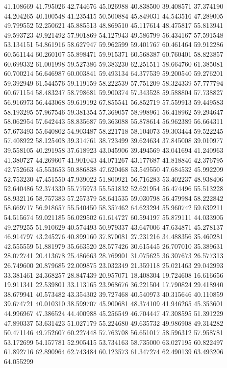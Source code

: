 41.108669
41.795026
42.744676
45.026988
40.838500
39.408571
37.374190
44.204265
40.100548
41.235415
50.500884
45.849031
44.543516
47.289005
49.799552
52.250621
45.885513
48.869510
45.117614
48.475817
55.813941
49.593723
49.921492
57.901869
54.127943
49.586799
56.434167
57.591548
53.134151
54.861916
58.627947
59.962599
59.401767
60.461464
59.912286
60.561144
60.260107
55.898471
59.915371
60.568387
60.760401
58.823857
60.699332
61.001998
59.527386
59.383230
62.251511
58.664760
61.385081
60.700214
56.646987
60.003841
59.493134
64.377539
59.200540
59.276201
59.392949
61.544576
59.119159
58.222539
57.751209
58.324339
57.777794
60.671154
58.483247
58.798681
59.900374
57.343528
59.588804
57.738827
56.916973
56.443068
59.619192
67.855541
56.852719
57.559913
59.449583
58.193295
57.967546
59.381354
57.369057
58.998961
56.418962
59.294647
58.062954
57.642443
58.835687
59.363088
55.878614
56.962389
56.664311
57.673493
55.640802
54.903487
58.221718
58.104073
59.303444
59.522245
57.408922
58.125408
39.314761
38.723499
39.624634
37.845008
39.010977
39.558105
40.291958
37.618923
43.045906
39.494569
43.041694
41.240963
41.380727
44.269607
41.901043
44.071267
43.177687
41.818846
42.376795
42.752663
45.553653
50.886838
47.620468
53.549550
47.684532
45.992209
52.753230
47.451550
47.939022
51.800921
56.716283
53.402237
48.938406
52.640486
52.374330
55.775973
55.551832
52.621954
56.474496
55.513228
58.932116
58.757383
57.257379
58.641535
59.030798
56.479984
58.222842
58.669717
56.918657
55.540450
58.357462
64.623294
55.960742
59.639211
54.515674
59.021185
56.029502
61.614727
60.594197
55.879111
44.033905
49.279255
51.910629
40.574493
50.979337
43.647006
47.634871
45.278137
46.914797
43.245276
40.899160
37.870081
27.231216
34.488356
35.460281
42.555559
51.881979
35.663520
28.577426
30.615445
26.707010
35.389631
28.072741
20.413678
25.486663
28.769901
31.075625
36.307673
26.577313
26.749600
20.879685
22.009875
23.032349
21.359118
25.021463
29.042993
33.381461
24.368257
28.847439
20.957071
18.408304
19.724608
16.616656
19.911341
22.539801
33.113165
23.968676
36.221504
17.790824
29.418940
38.679941
40.573482
43.354302
39.727468
40.540973
40.315646
40.110859
39.674721
40.010310
38.599707
45.900681
48.374109
41.946265
45.353601
44.996967
47.386524
44.400988
45.256549
46.704447
47.308595
51.391229
47.890337
53.631423
51.027179
55.224680
49.635732
49.986908
49.314282
50.471146
49.752607
60.227448
57.763708
56.651017
58.596312
57.958781
53.172699
54.157781
52.905415
53.734163
58.735000
63.027195
60.822497
61.892716
62.890964
62.743484
60.123573
61.347274
62.490139
63.493206
64.055299
